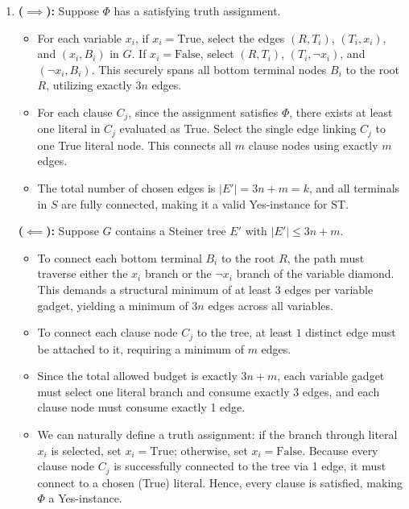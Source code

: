 \documentclass[12pt,a4paper]{article}
\makeatletter
\newtheorem*{solution}{Solution}
\theoremstyle{definition}
\renewenvironment{solution}[1][Solution] {\par\pushQED{\qed}\normalfont\topsep6\p@\@plus6\p@\relax\trivlist\item[\hskip\labelsep\bfseries#1\@addpunct{.}]\ignorespaces}{\popQED\endtrivlist\@endpefalse} \makeatother
\makeatother
\begin{document}
\begin{enumerate}
\begin{enumerate}
\begin{solution}
        \textbf{($\implies$):} Suppose $\Phi$ has a satisfying truth assignment. 
        \begin{itemize}
            \item For each variable $x_i$, if $x_i = \text{True}$, select the edges $(R, T_i)$, $(T_i, x_i)$, and $(x_i, B_i)$ in $G$. If $x_i = \text{False}$, select $(R, T_i)$, $(T_i, \neg x_i)$, and $(\neg x_i, B_i)$. This securely spans all bottom terminal nodes $B_i$ to the root $R$, utilizing exactly $3n$ edges.
            \item For each clause $C_j$, since the assignment satisfies $\Phi$, there exists at least one literal in $C_j$ evaluated as True. Select the single edge linking $C_j$ to one True literal node. This connects all $m$ clause nodes using exactly $m$ edges.
            \item The total number of chosen edges is $|E'| = 3n + m = k$, and all terminals in $S$ are fully connected, making it a valid Yes-instance for ST.
        \end{itemize}

        \textbf{($\impliedby$):} Suppose $G$ contains a Steiner tree $E'$ with $|E'| \le 3n + m$.
        \begin{itemize}
            \item To connect each bottom terminal $B_i$ to the root $R$, the path must traverse either the $x_i$ branch or the $\neg x_i$ branch of the variable diamond. This demands a structural minimum of at least $3$ edges per variable gadget, yielding a minimum of $3n$ edges across all variables.
            \item To connect each clause node $C_j$ to the tree, at least $1$ distinct edge must be attached to it, requiring a minimum of $m$ edges.
            \item Since the total allowed budget is exactly $3n + m$, each variable gadget must select one literal branch and consume exactly 3 edges, and each clause node must consume exactly 1 edge.
            \item We can naturally define a truth assignment: if the branch through literal $x_i$ is selected, set $x_i = \text{True}$; otherwise, set $x_i = \text{False}$. Because every clause node $C_j$ is successfully connected to the tree via 1 edge, it must connect to a chosen (True) literal. Hence, every clause is satisfied, making $\Phi$ a Yes-instance.
        \end{itemize}
        \end{solution}
    \end{enumerate}


\end{enumerate}
\end{document}
